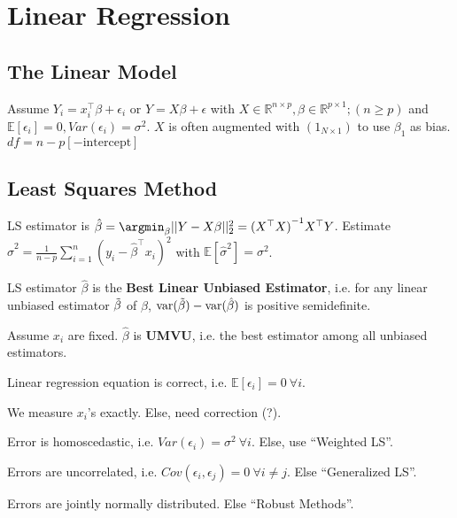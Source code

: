 \section{Linear Regression}\label{sec:multiple_linear_regression}
\subsection{The Linear Model}\label{subsec:the_linear_model}
\begin{sectionbox}\nospacing{}
  Assume $Y_i = x_{i}^{\top}\beta + \epsilon_{i}$ or $Y = X \beta + \epsilon$ with $X \in \mathbb{R}^{n \times p}, \beta \in \mathbb{R}^{p \times 1}; (n \geq p)$ and $\mathbb{E}[\epsilon_{i}]=0, Var(\epsilon_{i}) = \sigma^{2}$.
  $X$ is often augmented with $(1_{N\times 1})$ to use $\beta_{1}$ as bias.
  $df=n - p [-\text{intercept}]$
\end{sectionbox}
\subsection{Least Squares Method}\label{subsec:least_squares_method}
\begin{sectionbox}\nospacing{}
  LS estimator is $\hat \beta = \argmin_{\beta} ||Y - X\beta||^{2}_{2} = {(X^{\top}X)}^{-1} X^{\top}Y $.
  Estimate $\hat{\sigma}^{2} = \frac{1}{n-p}\sum_{i=1}^{n}(y_i-\hat{\beta}^\top x_i)^{2}$ with $\mathbb{E}[\hat{\sigma}^{2}] = \sigma^{2}$.
\end{sectionbox}


\begin{sectionbox}\nospacing{}
    LS estimator $\hat{\beta}$ is the \textbf{Best Linear Unbiased Estimator}, i.e. for any linear unbiased estimator $\Tilde{\beta}$ of $\beta$, $\mathrm{var}({\Tilde{\beta}}) - \mathrm{var}({\hat{\beta}})$ is positive semidefinite.
\end{sectionbox}

\begin{sectionbox}\nospacing{}
    Assume $x_i$ are fixed. $\hat{\beta}$ is \textbf{UMVU}, i.e. the best estimator among all unbiased estimators.
\end{sectionbox}

\begin{notebox}\nospacing{}
  \begin{enumeratenosep}[label=\roman*]
    \item Linear regression equation is correct, i.e. $\mathbb{E}[\epsilon_{i}]=0\ \forall i$.
    \item We measure $x_{i}$'s exactly. Else, need correction (?).
    \item Error is homoscedastic, i.e. $Var(\epsilon_{i})=\sigma^{2}\ \forall i$. Else, use ``Weighted LS''.
    \item Errors are uncorrelated, i.e. $Cov(\epsilon_{i}, \epsilon_{j}) = 0\ \forall i \neq j$. Else ``Generalized LS''.
    \item Errors are jointly normally distributed. Else ``Robust Methods''.
  \end{enumeratenosep}
\end{notebox}



